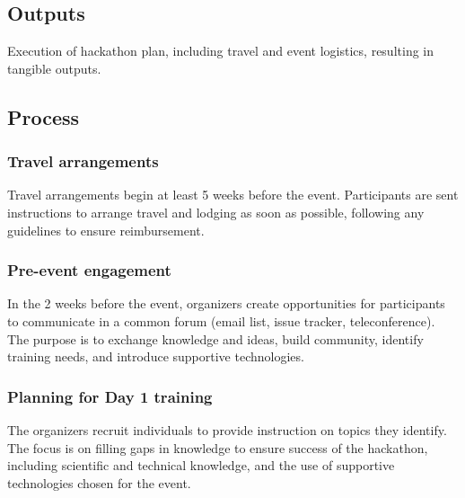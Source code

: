 \documentclass[11pt]{article}
\begin{document}
\subsection{Outputs}
Execution of hackathon plan, including travel and event logistics, resulting in tangible outputs.  
\subsection{Process}
\subsubsection*{Travel arrangements} Travel arrangements begin at least 5 weeks before the event. Participants are sent instructions to arrange travel and lodging as soon as possible, following any guidelines to ensure reimbursement. 
\subsubsection*{Pre-event engagement} In the 2 weeks before the event, organizers create opportunities for participants to communicate in a common forum (email list, issue tracker, teleconference). The purpose is to exchange knowledge and ideas, build community, identify training needs, and introduce supportive technologies. 
\subsubsection*{Planning for Day 1 training} The organizers recruit individuals to provide instruction on topics they identify. The focus is on filling gaps in knowledge to ensure success of the hackathon, including scientific and technical knowledge, and the use of supportive technologies chosen for the event. 
\end{document}
